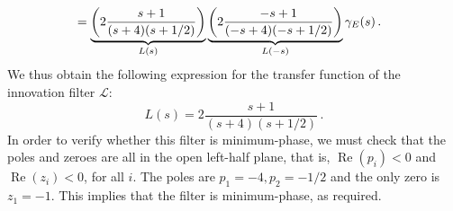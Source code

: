 \documentclass[11pt]{article}
\renewcommand{\Re}{\operatorname{Re}}
\begin{document}
\begin{enumerate}
\begin{align}
	&= \underbrace{\left(2 \frac{s+1}{(s+4)(s+1/2)}\right)}_{L(s)} \underbrace{\left(2 \frac{-s+1}{(-s+4)(-s+1/2)}\right)}_{L(-s)} \gamma_E(s)\,.\notag
	\end{align}
	We thus obtain the following expression for the transfer function of the innovation filter \(\mathcal{L}\):
	\begin{equation}
	\boxed{L(s) = 2 \frac{s+1}{(s+4)(s+1/2)}\,.}
	\end{equation}
	In order to verify whether this filter is minimum-phase,
	we must check that the poles and zeroes are all in the open left-half plane,
	that is, \(\Re(p_i) < 0\) and \(\Re(z_i) < 0\), for all \(i\).
	The poles are \(p_1 = -4, p_2 = -1/2\) and the only zero is \(z_1 = -1\).
	This implies that the filter is minimum-phase, as required.
\end{enumerate}
\end{document}

